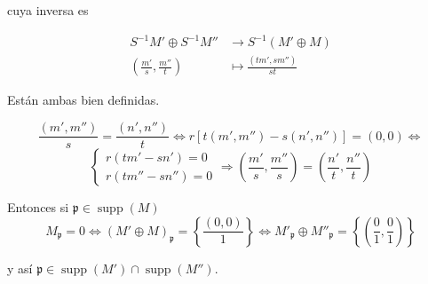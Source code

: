 \documentclass[./ejercicios.tex]{subfiles}
\begin{document}
cuya inversa es

\begin{align*}
S^{-1}M' \oplus S^{-1}M'' &\longrightarrow S^{-1}(M'\oplus M)\\
\left( \frac{m'}{s}, \frac{m''}{t} \right) &\longmapsto \frac{(tm',sm'')}{st}
\end{align*}

Están ambas bien definidas.

$$
\frac{(m',m'')}{s} = \frac{(n',n'')}{t} \iff r[t(m',m'')-s(n',n'')] = (0,0) \iff
$$
$$
\begin{cases}
  r(tm'-sn') = 0\\ r(tm''-sn'') = 0
\end{cases} \Rightarrow (\frac{m'}{s},\frac{m''}{s}) = (\frac{n'}{t},\frac{n''}{t} )
$$

Entonces si $\mathfrak{p}\in \operatorname{supp}(M)$
$$
M_\mathfrak{p} = 0 \iff (M'\oplus M)_\mathfrak{p} =\left  \{\frac{(0,0)}{1} \right\} \iff M'_\mathfrak{p} \oplus M''_\mathfrak{p} = \left \{\left (\frac{0}{1}, \frac{0}{1} \right) \right\}
$$

y así $\mathfrak{p}\in \operatorname{supp}(M') \cap \operatorname{supp}(M'')$.
\end{document}
